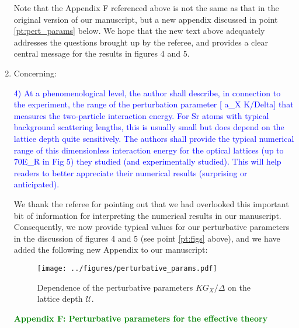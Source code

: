 \documentclass[preprint,showkeys,nofootinbib]{revtex4-1}
\newcommand{\U}{\mathcal{U}}
\newcommand{\1}{\mathds{1}}
\newcommand{\blue}[1]{\textcolor{blue}{#1}}
\newcommand{\green}[1]{\textcolor{green}{#1}}
\begin{document}
\begin{enumerate}
  Note that the Appendix F referenced above is not the same as that in
  the original version of our manuscript, but a new appendix discussed
  in point \ref{pt:pert_params} below.  We hope that the new text
  above adequately addresses the questions brought up by the referee,
  and provides a clear central message for the results in figures 4
  and 5.


\item Concerning:

  \blue{4) At a phenomenological level, the author shall describe, in
    connection to the experiment, the range of the perturbation
    parameter [ a\_X K/Delta] that measures the two-particle
    interaction energy. For Sr atoms with typical background
    scattering lengths, this is usually small but does depend on the
    lattice depth quite sensitively.  The authors shall provide the
    typical numerical range of this dimensionless interaction energy
    for the optical lattices (up to 70E\_R in Fig 5) they studied (and
    experimentally studied). This will help readers to better
    appreciate their numerical results (surprising or anticipated).}

  \label{pt:pert_params}

  We thank the referee for pointing out that we had overlooked this
  important bit of information for interpreting the numerical results
  in our manuscript.  Consequently, we now provide typical values for
  our perturbative parameters in the discussion of figures 4 and 5
  (see point \ref{pt:figs} above), and we have added the following new
  Appendix to our manuscript:

  \setcounter{figure}{0}
  \renewcommand\thefigure{F.\arabic{figure}}

  \begin{figure}
    \centering
    \texttt{[image: ../figures/perturbative\_params.pdf]}
    \caption{\footnotesize Dependence of the perturbative parameters
      $KG_X/\Delta$ on the lattice depth $\U$.}
  \end{figure}

  \green{{\bf Appendix F: Perturbative parameters for the effective
      theory}}


\end{enumerate}
\end{document}

